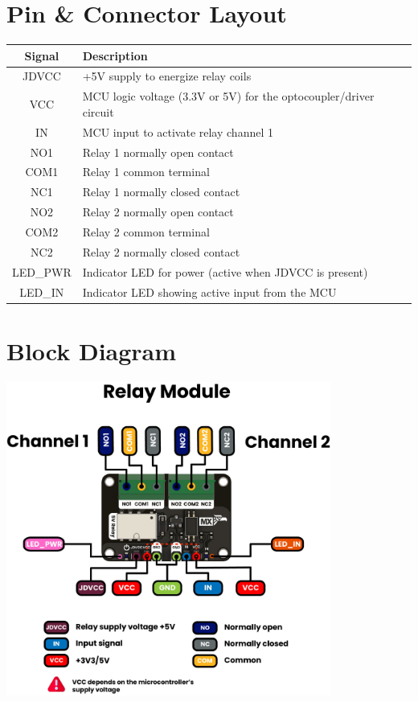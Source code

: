 \documentclass[10pt]{article}
\begin{document}
\section*{Pin \& Connector Layout}
\begin{tabularx}{\textwidth}{|c|>{\RaggedRight\arraybackslash}X|}
\hline
\rowcolor{headergray}
Signal & Description \\
\hline
JDVCC & +5V supply to energize relay coils \\
VCC & MCU logic voltage (3.3V or 5V) for the optocoupler/driver circuit \\
IN & MCU input to activate relay channel 1 \\
NO1 & Relay 1 normally open contact \\
COM1 & Relay 1 common terminal \\
NC1 & Relay 1 normally closed contact \\
NO2 & Relay 2 normally open contact \\
COM2 & Relay 2 common terminal \\
NC2 & Relay 2 normally closed contact \\
LED_PWR & Indicator LED for power (active when JDVCC is present) \\
LED_IN & Indicator LED showing active input from the MCU \\
\hline
\end{tabularx}


\FloatBarrier
\newpage
\vspace*{3em}
\section*{Block Diagram}
\vspace{1em}
\begin{center}
\includegraphics[width=0.80\textwidth,keepaspectratio]{images/function-diagram.jpg}
\end{center}
\newpage
\vspace*{3em}
\end{document}
